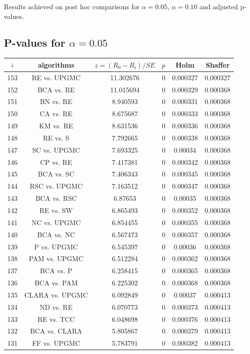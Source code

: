 \documentclass[a4paper,10pt]{article}
\begin{document}
\begin{landscape}
Results achieved on post hoc comparisons for $\alpha = 0.05$, $\alpha = 0.10$ and adjusted p-values.

\subsection{P-values for $\alpha=0.05$}

\begin{table}[!htp]
\centering\scriptsize
\begin{tabular}{cccccc}
$i$&algorithms&$z=(R_0 - R_i)/SE$&$p$&Holm&Shaffer\\
\hline153&RE vs. UPGMC&11.302676&0&0.000327&0.000327\\
152&BCA vs. RE&11.015694&0&0.000329&0.000368\\
151&BN vs. RE&8.940593&0&0.000331&0.000368\\
150&CA vs. RE&8.675687&0&0.000333&0.000368\\
149&KM vs. RE&8.631536&0&0.000336&0.000368\\
148&RE vs. S&7.792665&0&0.000338&0.000368\\
147&SC vs. UPGMC&7.693325&0&0.00034&0.000368\\
146&CP vs. RE&7.417381&0&0.000342&0.000368\\
145&BCA vs. SC&7.406343&0&0.000345&0.000368\\
144&RSC vs. UPGMC&7.163512&0&0.000347&0.000368\\
143&BCA vs. RSC&6.87653&0&0.00035&0.000368\\
142&RE vs. SW&6.865493&0&0.000352&0.000368\\
141&NC vs. UPGMC&6.854455&0&0.000355&0.000368\\
140&BCA vs. NC&6.567473&0&0.000357&0.000368\\
139&P vs. UPGMC&6.545397&0&0.00036&0.000368\\
138&PAM vs. UPGMC&6.512284&0&0.000362&0.000368\\
137&BCA vs. P&6.258415&0&0.000365&0.000368\\
136&BCA vs. PAM&6.225302&0&0.000368&0.000368\\
135&CLARA vs. UPGMC&6.092849&0&0.00037&0.000413\\
134&ND vs. RE&6.070773&0&0.000373&0.000413\\
133&RE vs. TCC&6.048698&0&0.000376&0.000413\\
132&BCA vs. CLARA&5.805867&0&0.000379&0.000413\\
131&FF vs. UPGMC&5.783791&0&0.000382&0.000413\\

\end{tabular}
\end{table}
\end{landscape}
\end{document}
